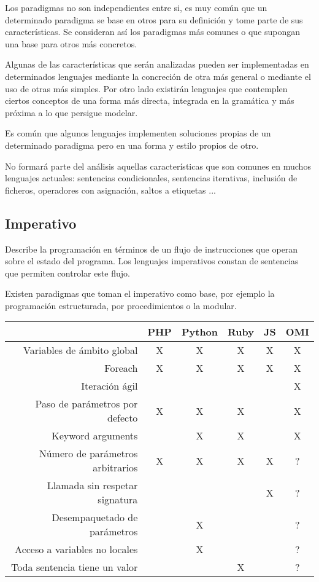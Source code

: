 Los paradigmas no son independientes entre si, es muy común que un determinado paradigma se 
base en otros para su definición y tome parte de sus características. Se consideran así
los paradigmas más comunes o que supongan una base para otros más concretos.

Algunas de las características que serán analizadas pueden ser 
implementadas en determinados lenguajes mediante la concreción de otra más general o mediante el uso de otras más simples. 
Por otro lado existirán lenguajes que contemplen ciertos
conceptos de una forma más directa, integrada en la gramática y más próxima a lo que persigue modelar.

Es común que algunos lenguajes implementen soluciones propias de un determinado paradigma pero en una forma y estilo
propios de otro.


No formará parte del análisis aquellas características que
son comunes en muchos lenguajes actuales: sentencias condicionales, sentencias iterativas, inclusión de ficheros, operadores con
asignación, saltos a etiquetas ...

\subsection {Imperativo}
Describe la programación en términos de un flujo de instrucciones que operan sobre el estado del programa. Los lenguajes
imperativos constan de sentencias que permiten controlar este flujo.

Existen paradigmas que toman el imperativo como base, por ejemplo la programación
estructurada, por procedimientos o la modular. 


\FloatBarrier
\begin{table}[h]
\begin{center}
 
\begin{tabular}{|r|c|c|c|c|c|} \hline
 & PHP  & Python & Ruby & JS & OMI\\ \hline
Variables de ámbito global  & X & X & X & X & X \\ \hline
Foreach & X & X & X & X & X \\ \hline
Iteración ágil & &  &  &  & X \\ \hline
Paso de parámetros por defecto & X & X & X & & X  \\ \hline
Keyword arguments &  & X & X & & X  \\ \hline
Número de parámetros arbitrarios & X & X & X & X & ?  \\ \hline
Llamada sin respetar signatura  &  &  &  & X & ?  \\ \hline
Desempaquetado de parámetros & & X & & & ? \\ \hline
Acceso a variables no locales & & X & & & ? \\ \hline
Toda sentencia tiene un valor & & & X & & ? \\ \hline
\end{tabular}
\end{center}
\end{table}
\FloatBarrier

